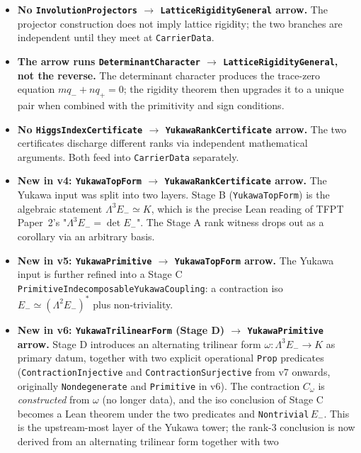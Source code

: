 \documentclass[11pt,a4paper]{article}
\begin{document}
\begin{itemize}[leftmargin=1.6em, itemsep=2pt]
\item \textbf{No \texttt{InvolutionProjectors} $\to$
    \texttt{LatticeRigidityGeneral} arrow.} The projector
    construction does not imply lattice rigidity; the two
    branches are independent until they meet at
    \texttt{CarrierData}.
\item \textbf{The arrow runs \texttt{DeterminantCharacter} $\to$
    \texttt{LatticeRigidityGeneral}, not the reverse.} The
    determinant character produces the trace-zero equation
    $m q_- + n q_+ = 0$; the rigidity theorem then upgrades it to
    a unique pair when combined with the primitivity and sign
    conditions.
\item \textbf{No \texttt{HiggsIndexCertificate} $\to$
    \texttt{YukawaRankCertificate} arrow.} The two certificates
    discharge different ranks via independent mathematical
    arguments. Both feed into \texttt{CarrierData} separately.
\item \textbf{New in v4: \texttt{YukawaTopForm} $\to$
    \texttt{YukawaRankCertificate} arrow.} The Yukawa input was
    split into two layers. Stage B (\texttt{YukawaTopForm})
    is the algebraic statement $\Lambda^3 E_- \simeq K$, which is
    the precise Lean reading of TFPT Paper~2's "$\Lambda^3 E_- =
    \det E_-$". The Stage A rank witness drops out as a corollary
    via an arbitrary basis.
\item \textbf{New in v5: \texttt{YukawaPrimitive} $\to$
    \texttt{YukawaTopForm} arrow.} The Yukawa input is further
    refined into a Stage C
    \texttt{PrimitiveIndecomposableYukawaCoupling}: a
    contraction iso $E_- \simeq (\Lambda^2 E_-)^*$ plus
    non-triviality.
\item \textbf{New in v6: \texttt{YukawaTrilinearForm} (Stage D)
    $\to$ \texttt{YukawaPrimitive} arrow.} Stage D introduces an
    alternating trilinear form $\omega : \Lambda^3 E_- \to K$ as
    primary datum, together with two explicit operational
    \texttt{Prop} predicates (\texttt{ContractionInjective} and
    \texttt{ContractionSurjective} from v7 onwards, originally
    \texttt{Nondegenerate} and \texttt{Primitive} in v6).
    The contraction $C_\omega$ is \emph{constructed} from
    $\omega$ (no longer data), and the iso conclusion of Stage C
    becomes a Lean theorem under the two predicates and
    \texttt{Nontrivial}\,$E_-$. This is the upstream-most layer
    of the Yukawa tower; the rank-3 conclusion is now derived
    from an alternating trilinear form together with two

\end{itemize}
\end{document}
